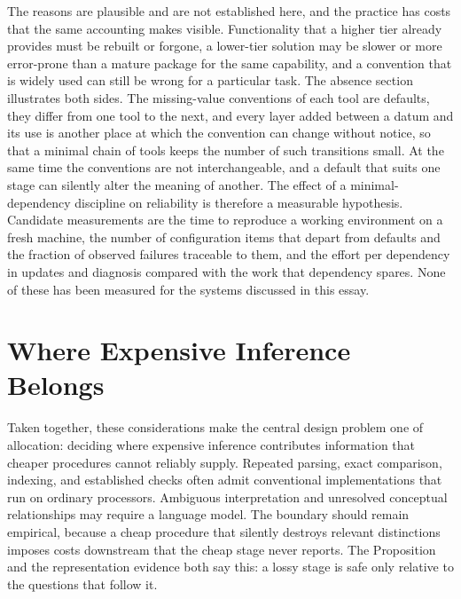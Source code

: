 \documentclass[11pt]{article}
\theoremstyle{remark}
\begin{document}
The reasons are plausible and are not established here, and the practice has costs that the same accounting makes visible. Functionality that a higher tier already provides must be rebuilt or forgone, a lower-tier solution may be slower or more error-prone than a mature package for the same capability, and a convention that is widely used can still be wrong for a particular task. The absence section illustrates both sides. The missing-value conventions of each tool are defaults, they differ from one tool to the next, and every layer added between a datum and its use is another place at which the convention can change without notice, so that a minimal chain of tools keeps the number of such transitions small. At the same time the conventions are not interchangeable, and a default that suits one stage can silently alter the meaning of another. The effect of a minimal-dependency discipline on reliability is therefore a measurable hypothesis. Candidate measurements are the time to reproduce a working environment on a fresh machine, the number of configuration items that depart from defaults and the fraction of observed failures traceable to them, and the effort per dependency in updates and diagnosis compared with the work that dependency spares. None of these has been measured for the systems discussed in this essay.

\section{Where Expensive Inference Belongs}

Taken together, these considerations make the central design problem one of allocation: deciding where expensive inference contributes information that cheaper procedures cannot reliably supply. Repeated parsing, exact comparison, indexing, and established checks often admit conventional implementations that run on ordinary processors. Ambiguous interpretation and unresolved conceptual relationships may require a language model. The boundary should remain empirical, because a cheap procedure that silently destroys relevant distinctions imposes costs downstream that the cheap stage never reports. The Proposition and the representation evidence both say this: a lossy stage is safe only relative to the questions that follow it.
\end{document}
